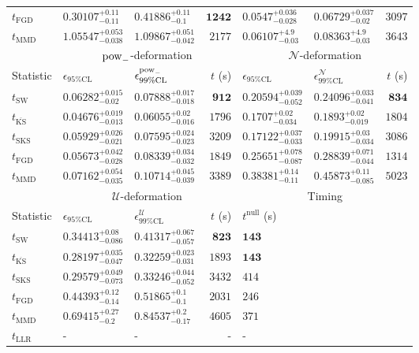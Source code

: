 \begin{tabular}{l|llr|llr}
	$t_{\mathrm{FGD}}$ & $0.30107_{-0.11}^{+0.11}$ & $0.41886_{-0.1}^{+0.11}$ & ${\mathbf{1242}}$ & $0.0547_{-0.028}^{+0.036}$ & ${\mathbf{0.06729_{-0.02}^{+0.037}}}$ & $3097$ \\
	$t_{\mathrm{MMD}}$ & $1.05547_{-0.038}^{+0.053}$ & $1.09867_{-0.042}^{+0.051}$ & $2177$ & $0.06107_{-0.03}^{+4.9}$ & $0.08363_{-0.03}^{+4.9}$ & $3643$ \\
	\toprule
	\multicolumn{1}{c}{} & \multicolumn{3}{c}{$\rm{pow}_{-}$-deformation} & \multicolumn{3}{c}{$\mathcal{N}$-deformation} \\
	Statistic & $\epsilon_{95\%\mathrm{CL}}$ & $\epsilon^  {\rm{pow}_{-}}_{99\%\mathrm{CL}}$ & $t$ (s) & $\epsilon_{95\%\mathrm{CL}}$ & $\epsilon^    {\mathcal{N}}_{99\%\mathrm{CL}}$ & $t$ (s) \\
	\midrule
	$t_{\mathrm{SW}}$ & $0.06282_{-0.02}^{+0.015}$ & $0.07888_{-0.018}^{+0.017}$ & ${\mathbf{912}}$ & $0.20594_{-0.052}^{+0.039}$ & $0.24096_{-0.041}^{+0.033}$ & ${\mathbf{834}}$ \\
	$t_{\overline{\mathrm{KS}}}$ & ${\mathbf{0.04676_{-0.013}^{+0.019}}}$ & ${\mathbf{0.06055_{-0.016}^{+0.02}}}$ & $1796$ & ${\mathbf{0.1707_{-0.034}^{+0.02}}}$ & ${\mathbf{0.1893_{-0.019}^{+0.02}}}$ & $1804$ \\
	$t_{\mathrm{SKS}}$ & $0.05929_{-0.021}^{+0.026}$ & $0.07595_{-0.023}^{+0.024}$ & $3209$ & $0.17122_{-0.033}^{+0.037}$ & $0.19915_{-0.034}^{+0.03}$ & $3086$ \\
	$t_{\mathrm{FGD}}$ & $0.05673_{-0.028}^{+0.042}$ & $0.08339_{-0.032}^{+0.034}$ & $1849$ & $0.25651_{-0.087}^{+0.078}$ & $0.28839_{-0.044}^{+0.071}$ & $1314$ \\
	$t_{\mathrm{MMD}}$ & $0.07162_{-0.035}^{+0.054}$ & $0.10714_{-0.039}^{+0.045}$ & $3389$ & $0.38381_{-0.11}^{+0.14}$ & $0.45873_{-0.085}^{+0.11}$ & $5023$ \\
	\toprule
	\multicolumn{1}{c}{} & \multicolumn{3}{c}{$\mathcal{U}$-deformation} & \multicolumn{3}{c}{Timing} \\
	Statistic & $\epsilon_{95\%\mathrm{CL}}$ & $\epsilon^    {\mathcal{U}}_{99\%\mathrm{CL}}$ & $t$ (s) & $t^{\mathrm{null}}$ (s) \\
	\midrule
	$t_{\mathrm{SW}}$ & $0.34413_{-0.086}^{+0.08}$ & $0.41317_{-0.057}^{+0.067}$ & ${\mathbf{823}}$ & ${\mathbf{143}}$ \\
	$t_{\overline{\mathrm{KS}}}$ & ${\mathbf{0.28197_{-0.047}^{+0.035}}}$ & ${\mathbf{0.32259_{-0.031}^{+0.023}}}$ & $1893$ & ${\mathbf{143}}$ \\
	$t_{\mathrm{SKS}}$ & $0.29579_{-0.073}^{+0.049}$ & $0.33246_{-0.052}^{+0.044}$ & $3432$ & $414$ \\
	$t_{\mathrm{FGD}}$ & $0.44393_{-0.14}^{+0.12}$ & $0.51865_{-0.1}^{+0.1}$ & $2031$ & $246$ \\
	$t_{\mathrm{MMD}}$ & $0.69415_{-0.2}^{+0.27}$ & $0.84537_{-0.17}^{+0.2}$ & $4605$ & $371$ \\
	$t_{\mathrm{LLR}}$ & - & - & - & - \\
	\bottomrule
\end{tabular}